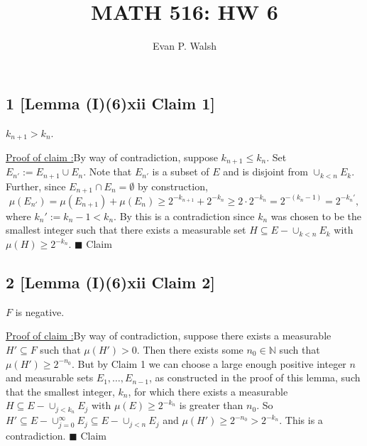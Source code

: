 \documentclass[12pt]{article}
\title{MATH 516: HW 6}
\author{Evan P. Walsh}
\newcounter{ProofCounter}
\newcounter{ClaimCounter}[ProofCounter]
\newenvironment{claimproof}[1]{\par\noindent\underline{Proof of claim \theClaimCounter:}\space#1}{\hfill $\blacksquare$ Claim \theClaimCounter}
\begin{document}
\maketitle

\subsection*{1 [Lemma (I)(6)xii Claim 1]}
\begin{tcolorbox}
$k_{n+1} > k_{n}$.
\end{tcolorbox}
\begin{claimproof}
By way of contradiction, suppose $k_{n+1} \leq k_{n}$. Set $E_{n'} := E_{n+1}\cup E_{n}$. Note that $E_{n'}$ is a subset of $E$ and is 
disjoint from $\cup_{k < n}E_{k}$. Further, since $E_{n+1}\cap E_{n} = \emptyset$ by construction,
\[ \mu(E_{n'}) = \mu(E_{n+1}) + \mu(E_{n}) \geq 2^{-k_{n+1}}  + 2^{-k_n}\geq 2\cdot 2^{-k_{n}} = 2^{-(k_{n}-1)} = 2^{-k_{n}'}, \]
where $k_{n}' := k_{n} - 1 < k_{n}$. By this is a contradiction since $k_{n}$ was chosen to be the smallest integer such that there exists a 
measurable set $H \subseteq E - \cup_{k < n}E_{k}$ with $\mu(H) \geq 2^{-k_{n}}$.
\end{claimproof}



\subsection*{2 [Lemma (I)(6)xii Claim 2]}
\begin{tcolorbox}
$F$ is negative.
\end{tcolorbox}
\begin{claimproof}
By way of contradiction, suppose there exists a measurable $H' \subseteq F$ such that $\mu(H') > 0$. Then there exists some $n_{0} \in \mathbb{N}$ such that 
$\mu(H') \geq 2^{-n_{0}}$. But by Claim 1 we can choose a large enough positive integer $n$ and measurable sets $E_1, \hdots, E_{n-1}$, as constructed 
in the proof of this lemma, such that the smallest integer, $k_n$, for which there exists a measurable $H \subseteq E - \cup_{j < k_n}E_j$ with $\mu(E)
\geq 2^{-k_n}$ is greater than $n_0$. So $H' \subseteq E - \cup_{j=0}^{\infty}E_j \subseteq E - \cup_{j < n}E_j$ and $\mu(H') \geq 2^{-n_0} >
2^{-k_n}$. This is a contradiction.
\end{claimproof}


\newpage
\end{document}
